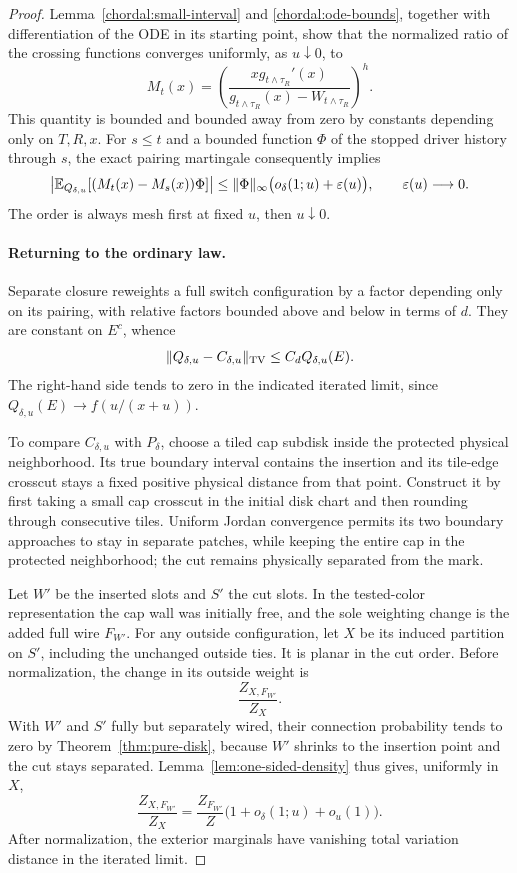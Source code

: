 \begin{proof}
Lemma~\ref{chordal:small-interval} and
\eqref{chordal:ode-bounds}, together with differentiation of the
ODE in its starting point, show that the normalized ratio of the
crossing functions converges uniformly, as $u\downarrow0$, to
\begin{equation}\label{chordal:martingale-observable}
 M_t(x)=\left(
 \frac{xg_{t\wedge\tau_R}'(x)}
 {g_{t\wedge\tau_R}(x)-W_{t\wedge\tau_R}}
 \right)^h.
\end{equation}
This quantity is bounded and bounded away from zero by constants
depending only on $T,R,x$.  For $s\le t$ and a bounded function
$\Phi$ of the stopped driver history through $s$, the exact
pairing martingale consequently implies
\begin{equation}\label{chordal:approximate-martingale}
 \left|\mathbb E_{Q_{\delta,u}}
 [(M_t(x)-M_s(x))\Phi]\right|
 \le \|\Phi\|_\infty
       \bigl(o_\delta(1;u)+\varepsilon(u)\bigr),
 \qquad \varepsilon(u)\longrightarrow0.
\end{equation}
The order is always mesh first at fixed $u$, then $u\downarrow0$.

\paragraph{Returning to the ordinary law.}
Separate closure reweights a full switch configuration by a factor
depending only on its pairing, with relative factors bounded above
and below in terms of $d$.  They are constant on $E^c$, whence
\[
 \|Q_{\delta,u}-C_{\delta,u}\|_{\rm TV}
 \le C_d Q_{\delta,u}(E).
\]
The right-hand side tends to zero in the indicated iterated limit,
since $Q_{\delta,u}(E)\to f(u/(x+u))$.

To compare $C_{\delta,u}$ with $P_\delta$, choose a tiled cap
subdisk inside the protected physical neighborhood.  Its true
boundary interval contains the insertion and its tile-edge crosscut
stays a fixed positive physical distance from that point.  Construct
it by first taking a small cap crosscut in the initial disk chart
and then rounding through consecutive tiles.  Uniform Jordan
convergence permits its two boundary approaches to stay in
separate patches, while keeping the entire cap in the protected
neighborhood; the cut remains physically separated from the mark.

Let $W'$ be the inserted slots and $S'$ the cut slots.  In the
tested-color representation the cap wall was initially free, and
the sole weighting change is the added full wire $F_{W'}$.
For any outside configuration, let $X$ be its induced partition
on $S'$, including the unchanged outside ties.  It is planar in
the cut order.  Before normalization, the change in its outside
weight is
\[
 \frac{Z_{X,F_{W'}}}{Z_X}.
\]
With $W'$ and $S'$ fully but separately wired, their connection
probability tends to zero by Theorem~\ref{thm:pure-disk}, because
$W'$ shrinks to the insertion point and the cut stays separated.
Lemma~\ref{lem:one-sided-density} thus gives, uniformly in $X$,
\[
 \frac{Z_{X,F_{W'}}}{Z_X}
  =\frac{Z_{F_{W'}}}{Z}
       \bigl(1+o_\delta(1;u)+o_u(1)\bigr).
\]
After normalization, the exterior marginals have vanishing total
variation distance in the iterated limit.


\end{proof}
